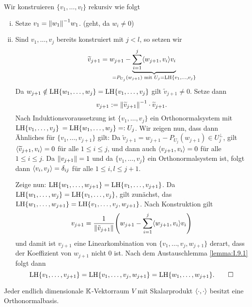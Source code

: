 \begin{beweis}
	Wir konstruieren $\{v_1,\dots,v_l\}$ rekursiv wie folgt
	\begin{enumerate}[(i)]
		\item Setze $v_1 = \no{w_1}^{-1} w_1$. (geht, da $w_i \neq 0$)
		\item Sind $v_1,\dots,v_j$ bereits konstruiert mit $j < l$, so setzen wir
		\[
			\widetilde{v}_{j+1} = w_{j+1} - \Underbrace{\sum_{i=1}^{j} \sk{w_{j+1},v_i} v_i}{\mathclap{=P_{U_j}(w_{j+1}) \text{ mit } U_j = \LH\{v_1,\dots,v_j\}}}
		\]
		Da $w_{j+1} \notin \operatorname{LH}\{w_1,\dots,w_j\} = \operatorname{LH}\{v_1,\dots,v_j\}$ gilt $\widetilde{v}_{j+1} \neq 0$.
		Setze dann
		\[
			v_{j+1} := \left\lVert\widetilde{v}_{j+1}\right\rVert^{-1} \cdot \widetilde{v}_{j+1}.
		\]
		Nach Induktionsvoraussetzung ist $\{v_1,\dots,v_j\}$ ein Orthonormalsystem mit $\operatorname{LH}\{v_1,\dots,v_j\}$ \linebreak $= \operatorname{LH}\{w_1,\dots,w_j\} =: U_j$.
		Wir zeigen nun, dass dann Ähnliches für $\{v_1,\dots,v_{j+1}\}$ gilt:
		\newpage
		Da $\widetilde{v}_{j+1} = w_{j+1} - P_{U_j}(w_{j+1}) \in U_j^\perp$, gilt $\left\langle\widetilde{v}_{j+1},v_i\right\rangle = 0$ für alle $1 \leq i \leq j$, und dann auch $\left\langle v_{j+1},v_i\right\rangle = 0$ für alle $1 \leq i \leq j$.
		Da $\left\lVert v_{j+1}\right\rVert = 1$ und da $\{v_1,\dots,v_j\}$ ein Orthonormalsystem ist, folgt dann $\left\langle v_i,v_j\right\rangle = \delta_{ij}$ für alle $1 \leq i,l \leq  j+1$.
		
		Zeige nun: $\operatorname{LH}\{w_1,\dots,w_{j+1}\} = \operatorname{LH}\{v_1,\dots,v_{j+1}\}$.
		Da $\operatorname{LH}\{w_1,\dots,w_j\} = \operatorname{LH}\{v_1,\dots,v_j\}$, gilt zunächst, das $\operatorname{LH}\{w_1,\dots,w_{j+1}\} = \operatorname{LH}\{v_1,\dots,v_j,w_{j+1}\}$.
		Nach Konstruktion gilt
		\[
			v_{j+1} = \frac{1}{\no{\tilde{v}_{j+1}}} \enb{w_{j+1} - \sum_{i=1}^{j} \sk{w_{j+1},v_i} v_i}
		\]
		und damit ist $v_{j+1}$ eine Linearkombination von $\{v_1,\dots,v_j,w_{j+1}\}$ derart, dass der Koeffizient von $w_{j+1}$ nicht $0$ ist.
		Nach dem Austauschlemma \ref{lemma:I.9.1} folgt dann
		\[
			\operatorname{LH}\{v_1,\dots,v_{j+1}\} = \operatorname{LH}\{v_1,\dots,v_j,w_{j+1}\} = \operatorname{LH}\{w_1,\dots,w_{j+1}\}. \qedhere
		\]
	\end{enumerate}
\end{beweis}

\begin{korollar}
	\label{kor:4.14}
	Jeder endlich dimensionale $\mathbb{K}$-Vektorraum $V$ mit Skalarprodukt $\left\langle\cdot,\cdot\right\rangle$ besitzt eine Orthonormalbasis.
\end{korollar}

